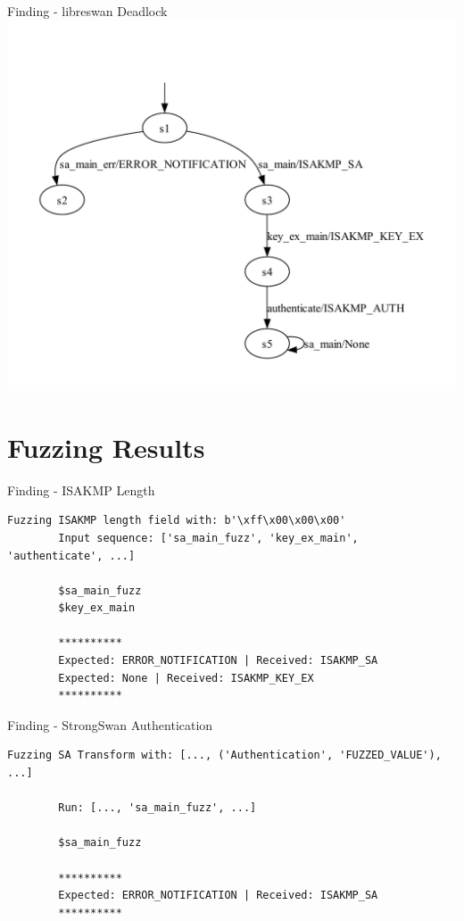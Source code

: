 \documentclass[aspectratio=169, xcolor=table]{beamer}
\begin{document}
\begin{frame}{Finding - libreswan Deadlock}
	\vspace{-4em}
	\centering
	\includegraphics[height=1.0\textheight, trim={8em 0 0 0}]{models/LearnedModelLibreReference}
\end{frame}

\section*{Fuzzing Results}
\begin{frame}[fragile]{Finding - ISAKMP Length}
	\vspace{-2ex}
	\begin{lstlisting}[]
		Fuzzing ISAKMP length field with: b'\xff\x00\x00\x00'
		Input sequence: ['sa_main_fuzz', 'key_ex_main', 'authenticate', ...]
		
		$sa_main_fuzz
		$key_ex_main
		
		**********
		Expected: ERROR_NOTIFICATION | Received: ISAKMP_SA
		Expected: None | Received: ISAKMP_KEY_EX
		**********
	\end{lstlisting}
\end{frame}

\begin{frame}[fragile]{Finding - StrongSwan Authentication}
	\vspace{-2ex}
	\begin{lstlisting}[]
		Fuzzing SA Transform with: [..., ('Authentication', 'FUZZED_VALUE'), ...]
		
		Run: [..., 'sa_main_fuzz', ...]
		
		$sa_main_fuzz
		
		**********
		Expected: ERROR_NOTIFICATION | Received: ISAKMP_SA
		**********
	\end{lstlisting}
\end{frame}
\end{document}
